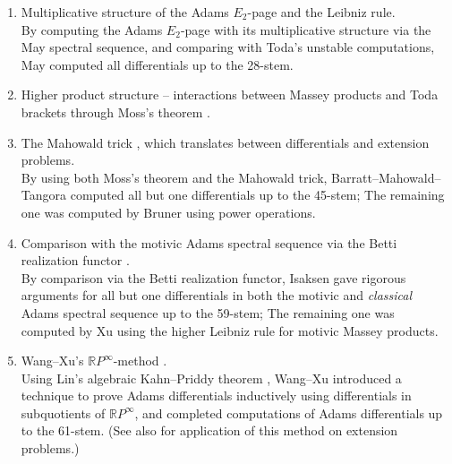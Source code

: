 \documentclass{amsart}
\numberwithin{equation}{section}
\begin{document}
\begin{enumerate}
    \item Multiplicative structure of the Adams $E_2$-page and the Leibniz rule. \\
    
     \noindent By computing the Adams $E_2$-page with its multiplicative structure via the May spectral sequence, and comparing with Toda's unstable computations, May \cite{Maythesis} computed all differentials up to the 28-stem.\\
    
    \item Higher product structure -- interactions between Massey products and Toda brackets through Moss's theorem \cite{Moss}.\\

    \item The Mahowald trick \cite{MahowaldTangora}, which translates between differentials and extension problems.\\

    \noindent By using both Moss's theorem and the Mahowald trick, Barratt--Mahowald--Tangora \cite{MahowaldTangora, BarrattMahowaldTangora} computed all but one differentials up to the 45-stem; The remaining one was computed by Bruner \cite{Brunerdiff} using power operations.\\

    \item Comparison with the motivic Adams spectral sequence via the Betti realization functor \cite{DuggerIsaksen}.\\

    \noindent By comparison via the Betti realization functor, Isaksen \cite{Isaksen} gave rigorous arguments for all but one differentials in both the motivic and \emph{classical} Adams spectral sequence up to the 59-stem; The remaining one was computed by Xu \cite{IsaksenXu} using the higher Leibniz rule for motivic Massey products. \\

    \item Wang--Xu's $\mathbb{R}P^\infty$-method \cite{WX61}.\\

    \noindent Using Lin's algebraic Kahn--Priddy theorem \cite{LinalgKP}, Wang--Xu introduced a technique to prove Adams differentials inductively using differentials in subquotients of $\mathbb{R}P^\infty$, and completed computations of Adams differentials up to the 61-stem. (See also \cite{WangXu51ext} for application of this method on extension problems.) \\


\end{enumerate}
\end{document}
